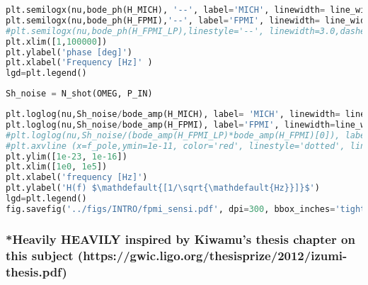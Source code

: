\begin{lstlisting}[frame=single, language=Python]
plt.semilogx(nu,bode_ph(H_MICH), '--', label='MICH', linewidth= line_width, alpha=.5)
plt.semilogx(nu,bode_ph(H_FPMI),'--', label='FPMI', linewidth= line_width)
#plt.semilogx(nu,bode_ph(H_FPMI_LP),linestyle='--', linewidth=3.0,dashes=(3,10))
plt.xlim([1,100000])
plt.ylabel('phase [deg]')
plt.xlabel('Frequency [Hz]' )
lgd=plt.legend()
\end{lstlisting}

\begin{lstlisting}[frame=single, language=Python]
Sh_noise = N_shot(OMEG, P_IN)
\end{lstlisting}

\begin{lstlisting}[frame=single, language=Python]
plt.loglog(nu,Sh_noise/bode_amp(H_MICH), label= 'MICH', linewidth= line_width, alpha=.5)
plt.loglog(nu,Sh_noise/bode_amp(H_FPMI), label='FPMI', linewidth=line_width)
#plt.loglog(nu,Sh_noise/(bode_amp(H_FPMI_LP)*bode_amp(H_FPMI)[0]), label='FPMI LP', linewidth = 20.0, alpha=0.25)
#plt.axvline (x=f_pole,ymin=1e-11, color='red', linestyle='dotted', linewidth=3)
plt.ylim([1e-23, 1e-16])
plt.xlim([1e0, 1e5])
plt.xlabel('frequency [Hz]')
plt.ylabel('H(f) $\mathdefault{[1/\sqrt{\mathdefault{Hz}}]}$')
lgd=plt.legend()
fig.savefig('../figs/INTRO/fpmi_sensi.pdf', dpi=300, bbox_inches='tight')
\end{lstlisting}

\hypertarget{heavily-heavily-inspired-by-kiwamus-thesis-chapter-on-this-subject-httpsgwic.ligo.orgthesisprize2012izumi-thesis.pdf}{%
\subsubsection{*Heavily HEAVILY inspired by Kiwamu's thesis chapter on
this subject
(https://gwic.ligo.org/thesisprize/2012/izumi-thesis.pdf)}\label{heavily-heavily-inspired-by-kiwamus-thesis-chapter-on-this-subject-httpsgwic.ligo.orgthesisprize2012izumi-thesis.pdf}}
